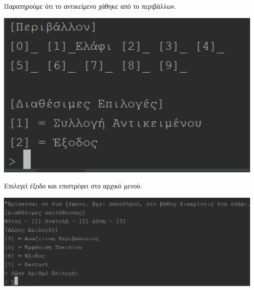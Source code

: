 \noindent
Παρατηρούμε ότι το αντικείμενο χάθηκε από το περιβάλλων.
\begin{center}
			\includegraphics[width=1\textwidth]{image/3.2.PNG}
\end{center}

\noindent
Επιλεγεί έξοδο και επιστρέφει στο αρχικό μενού.
\begin{center}
			\includegraphics[width=1\textwidth]{image/3.3.PNG}
\end{center}

